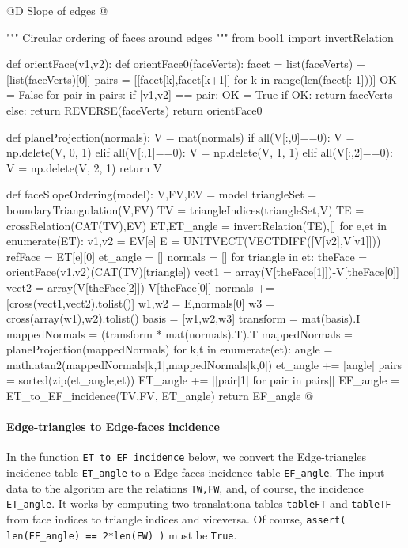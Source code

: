 \documentclass[11pt,oneside]{article}    %
\begin{document}
@D Slope of edges
@{""" Circular ordering of faces around edges """
from bool1 import invertRelation

def orientFace(v1,v2):
    def orientFace0(faceVerts):
        facet = list(faceVerts) + [list(faceVerts)[0]]
        pairs = [[facet[k],facet[k+1]] for k in range(len(facet[:-1]))]
        OK = False
        for pair in pairs:
            if [v1,v2] == pair: OK = True
        if OK: return faceVerts
        else: return REVERSE(faceVerts)
    return orientFace0

def planeProjection(normals):
    V = mat(normals)
    if all(V[:,0]==0): V = np.delete(V, 0, 1)
    elif all(V[:,1]==0): V = np.delete(V, 1, 1)
    elif all(V[:,2]==0): V = np.delete(V, 2, 1)
    return V

def faceSlopeOrdering(model):
    V,FV,EV = model
    triangleSet = boundaryTriangulation(V,FV)
    TV = triangleIndices(triangleSet,V)
    TE = crossRelation(CAT(TV),EV)
    ET,ET_angle = invertRelation(TE),[]
    for e,et in enumerate(ET):
        v1,v2 = EV[e]
        E = UNITVECT(VECTDIFF([V[v2],V[v1]]))
        refFace = ET[e][0]
        et_angle = []
        normals = []
        for triangle in et:
            theFace = orientFace(v1,v2)(CAT(TV)[triangle])
            vect1 = array(V[theFace[1]])-V[theFace[0]]
            vect2 = array(V[theFace[2]])-V[theFace[0]]
            normals += [cross(vect1,vect2).tolist()]
        w1,w2 = E,normals[0]
        w3 = cross(array(w1),w2).tolist()
        basis = [w1,w2,w3]
        transform = mat(basis).I
        mappedNormals = (transform * mat(normals).T).T
        mappedNormals = planeProjection(mappedNormals)
        for k,t in enumerate(et):
            angle = math.atan2(mappedNormals[k,1],mappedNormals[k,0])
            et_angle += [angle]
        pairs = sorted(zip(et_angle,et))
        ET_angle += [[pair[1] for pair in pairs]]
    EF_angle = ET_to_EF_incidence(TV,FV, ET_angle)
    return EF_angle
@}



\paragraph{Edge-triangles to Edge-faces incidence}

In the function \texttt{ET\_to\_EF\_incidence} below, we convert the Edge-triangles incidence table \texttt{ET\_angle} to a Edge-faces incidence table \texttt{EF\_angle}. The input data to the algoritm are the relations \texttt{TW,FW}, and, of course, the incidence \texttt{ET\_angle}. It works by computing two translationa tables \texttt{tableFT} and \texttt{tableTF} from face indices to triangle indices and viceversa. Of course, \texttt{assert( len(EF\_angle) == 2*len(FW) )} must be \texttt{True}.
\end{document}
